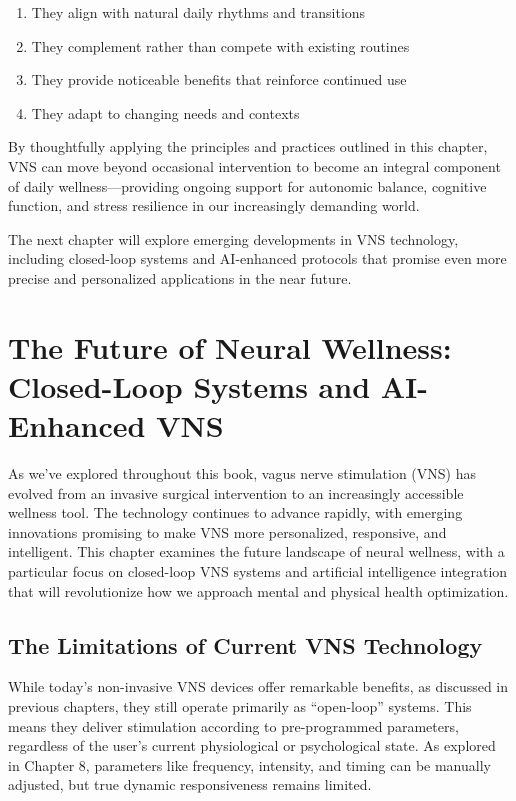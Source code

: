\documentclass[
  Letterpaper,
]{scrbook}
\providecommand{\tightlist}{%
  \setlength{\itemsep}{0pt}\setlength{\parskip}{0pt}}\usepackage{longtable,booktabs,array}
\begin{document}
\begin{enumerate}
\def\labelenumi{\arabic{enumi}.}
\tightlist
\item
  They align with natural daily rhythms and transitions
\item
  They complement rather than compete with existing routines
\item
  They provide noticeable benefits that reinforce continued use
\item
  They adapt to changing needs and contexts
\end{enumerate}

By thoughtfully applying the principles and practices outlined in this
chapter, VNS can move beyond occasional intervention to become an
integral component of daily wellness---providing ongoing support for
autonomic balance, cognitive function, and stress resilience in our
increasingly demanding world.

The next chapter will explore emerging developments in VNS technology,
including closed-loop systems and AI-enhanced protocols that promise
even more precise and personalized applications in the near future.


\chapter{The Future of Neural Wellness: Closed-Loop Systems and
AI-Enhanced
VNS}\label{the-future-of-neural-wellness-closed-loop-systems-and-ai-enhanced-vns}

As we've explored throughout this book, vagus nerve stimulation (VNS)
has evolved from an invasive surgical intervention to an increasingly
accessible wellness tool. The technology continues to advance rapidly,
with emerging innovations promising to make VNS more personalized,
responsive, and intelligent. This chapter examines the future landscape
of neural wellness, with a particular focus on closed-loop VNS systems
and artificial intelligence integration that will revolutionize how we
approach mental and physical health optimization.

\section{The Limitations of Current VNS
Technology}\label{the-limitations-of-current-vns-technology}

While today's non-invasive VNS devices offer remarkable benefits, as
discussed in previous chapters, they still operate primarily as
``open-loop'' systems. This means they deliver stimulation according to
pre-programmed parameters, regardless of the user's current
physiological or psychological state. As explored in Chapter 8,
parameters like frequency, intensity, and timing can be manually
adjusted, but true dynamic responsiveness remains limited.
\end{document}
